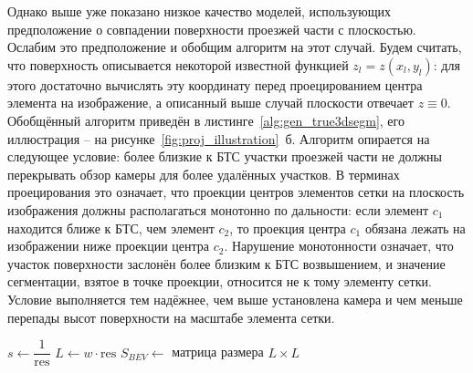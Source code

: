 Однако выше уже показано низкое качество моделей, использующих предположение о совпадении поверхности проезжей части с плоскостью. Ослабим это предположение и обобщим алгоритм на этот случай. Будем считать, что поверхность описывается некоторой известной функцией $z_l = z(x_l, y_l)$: для этого достаточно вычислять эту координату перед проецированием центра элемента на изображение, а описанный выше случай плоскости отвечает $z \equiv 0$. Обобщённый алгоритм приведён в листинге~\ref{alg:gen_true3dsegm}, его иллюстрация -- на рисунке~\cref{fig:proj_illustration}~б. Алгоритм опирается на следующее условие: более близкие к БТС участки проезжей части не должны перекрывать обзор камеры для более удалённых участков. В терминах проецирования это означает, что проекции центров элементов сетки на плоскость изображения должны располагаться монотонно по дальности: если элемент $c_1$ находится ближе к БТС, чем элемент $c_2$, то проекция центра $c_1$ обязана лежать на изображении ниже проекции центра $c_2$. Нарушение монотонности означает, что участок поверхности заслонён более близким к БТС возвышением, и значение сегментации, взятое в точке проекции, относится не к тому элементу сетки. Условие выполняется тем надёжнее, чем выше установлена камера и чем меньше перепады высот поверхности на масштабе элемента сетки.

\begin{algorithm}
	\caption{Алгоритм проецирования сегментации проезжей части на вид сверху}
	\label{alg:gen_true3dsegm}
	\LinesNumbered
	$s \leftarrow \dfrac{1}{\text{res}}$ \;
	$L \leftarrow w \cdot \text{res}$ \;
	$S_{BEV} \leftarrow $ матрица размера $L\times L$\;
   \;
\end{algorithm}

